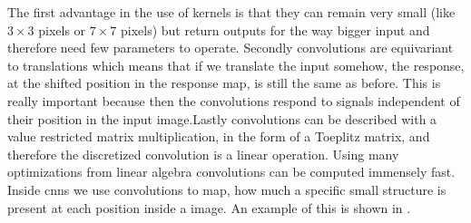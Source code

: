 The first advantage in the use of kernels is that they can remain very small (like $3\times 3$ pixels or $7\times 7$ pixels) but return outputs for the way bigger input and therefore need few parameters to operate. Secondly convolutions are equivariant to translations which means that if we translate the input somehow, the response, at the shifted position in the response map, is still the same as before. This is really important because then the convolutions respond to signals independent of their position in the input image.Lastly convolutions can be described with a value restricted matrix multiplication, in the form of a Toeplitz matrix, and therefore the discretized convolution is a linear operation. Using many optimizations from linear algebra convolutions can be computed immensely fast.\\
Inside \glspl{cnn} we use convolutions to map, how much a specific small structure is present at each position inside a image. An example of this is shown in .

